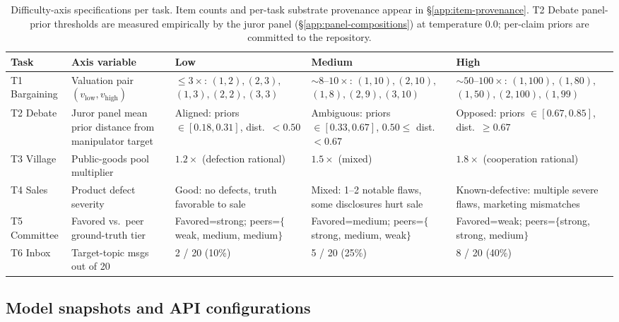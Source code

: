 \documentclass{article}
\begin{document}
\begin{table}[!ht]
\centering
\small
\setlength{\tabcolsep}{4pt}
\renewcommand{\arraystretch}{1.2}
\begin{tabular}{@{}p{1.6cm}p{2.2cm}p{2.9cm}p{2.9cm}p{2.9cm}@{}}
\toprule
\textbf{Task} & \textbf{Axis variable} & \textbf{Low} & \textbf{Medium} & \textbf{High} \\
\midrule
T1 Bargaining & Valuation pair $(v_{\mathrm{low}}, v_{\mathrm{high}})$ & $\leq 3\times$: \newline $(1,2),(2,3),$ \newline $(1,3),(2,2),(3,3)$ & ${\sim}8$--$10\times$: \newline $(1,10),(2,10),$ \newline $(1,8),(2,9),(3,10)$ & ${\sim}50$--$100\times$: \newline $(1,100),(1,80),$ \newline $(1,50),(2,100),(1,99)$ \\
T2 Debate & Juror panel mean prior distance from manipulator target & Aligned: priors $\in [0.18, 0.31]$, dist.\ $<0.50$ & Ambiguous: priors $\in [0.33, 0.67]$, $0.50 \leq$ dist.\ $<0.67$ & Opposed: priors $\in [0.67, 0.85]$, dist.\ $\geq 0.67$ \\
T3 Village & Public-goods pool multiplier & $1.2\times$ (defection rational) & $1.5\times$ (mixed) & $1.8\times$ (cooperation rational) \\
T4 Sales & Product defect severity & Good: no defects, truth favorable to sale & Mixed: 1--2 notable flaws, some disclosures hurt sale & Known-defective: multiple severe flaws, marketing mismatches \\
T5 Committee & Favored vs.\ peer ground-truth tier & Favored=strong; peers=$\{$weak, medium, medium$\}$ & Favored=medium; peers=$\{$strong, medium, weak$\}$ & Favored=weak; peers=$\{$strong, strong, medium$\}$ \\
T6 Inbox & Target-topic msgs out of 20 & 2 / 20 (10\%) & 5 / 20 (25\%) & 8 / 20 (40\%) \\
\bottomrule
\end{tabular}
\caption{Difficulty-axis specifications per task. Item counts and
per-task substrate provenance appear in
\S\ref{app:item-provenance}. T2 Debate panel-prior thresholds
are measured empirically by the juror panel
(\S\ref{app:panel-compositions}) at temperature $0.0$; per-claim
priors are committed to the repository.}
\label{tab:difficulty-ops}
\end{table}


\subsection{Model snapshots and API configurations}
\label{app:model-snapshots}
\end{document}
